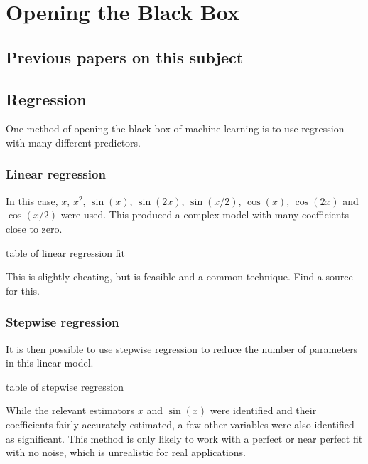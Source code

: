 
\chapter{Opening the Black Box}

\section{Previous papers on this subject}

\section{Regression}

One method of opening the black box of machine learning is to use regression with many different predictors.

\subsection{Linear regression}

In this case, \(x\), \(x^2\), \(\sin(x)\), \(\sin(2x)\), \(\sin(x/2)\), \(\cos(x)\), \(\cos(2x)\) and \(\cos(x/2)\) were used.
This produced a complex model with many coefficients close to zero.

\begin{todo}
	table of linear regression fit
\end{todo}

\begin{todo}
	This is slightly cheating, but is feasible and a common technique. Find a source for this.
\end{todo}

\subsection{Stepwise regression}

It is then possible to use stepwise regression to reduce the number of parameters in this linear model.

\begin{todo}
	table of stepwise regression
\end{todo}

While the relevant estimators \(x\) and \(\sin(x)\) were identified and their coefficients fairly accurately estimated, a few other variables were also identified as significant.
This method is only likely to work with a perfect or near perfect fit with no noise, which is unrealistic for real applications.

